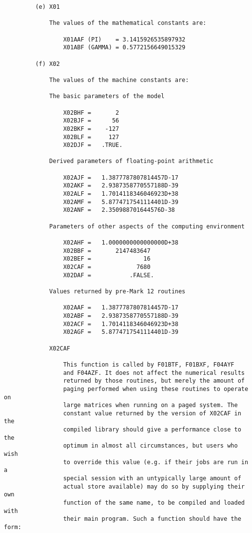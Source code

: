 \begin{small}
\begin{verbatim}
         (e) X01

             The values of the mathematical constants are:

                 X01AAF (PI)    = 3.1415926535897932
                 X01ABF (GAMMA) = 0.5772156649015329

         (f) X02

             The values of the machine constants are:

             The basic parameters of the model

                 X02BHF =       2
                 X02BJF =      56
                 X02BKF =    -127
                 X02BLF =     127
                 X02DJF =   .TRUE.

             Derived parameters of floating-point arithmetic

                 X02AJF =   1.3877787807814457D-17
                 X02AKF =   2.9387358770557188D-39
                 X02ALF =   1.7014118346046923D+38
                 X02AMF =   5.8774717541114401D-39
                 X02ANF =   2.350988701644576D-38

             Parameters of other aspects of the computing environment

                 X02AHF =   1.0000000000000000D+38
                 X02BBF =       2147483647
                 X02BEF =               16
                 X02CAF =             7680
                 X02DAF =           .FALSE.

             Values returned by pre-Mark 12 routines

                 X02AAF =   1.3877787807814457D-17
                 X02ABF =   2.9387358770557188D-39
                 X02ACF =   1.7014118346046923D+38
                 X02AGF =   5.8774717541114401D-39

             X02CAF

                 This function is called by F01BTF, F01BXF, F04AYF
                 and F04AZF. It does not affect the numerical results
                 returned by those routines, but merely the amount of
                 paging performed when using these routines to operate on
                 large matrices when running on a paged system. The
                 constant value returned by the version of X02CAF in the
                 compiled library should give a performance close to the
                 optimum in almost all circumstances, but users who wish
                 to override this value (e.g. if their jobs are run in a
                 special session with an untypically large amount of
                 actual store available) may do so by supplying their own
                 function of the same name, to be compiled and loaded with
                 their main program. Such a function should have the form:


\end{verbatim}
\end{small}
